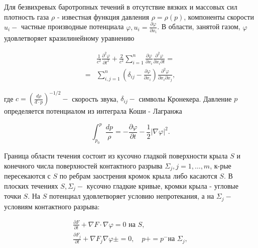 \documentclass[10pt]{article}
\begin{document}
Для безвихревых баротропных течений в отсутствие вязких и массовых сил плотность газа $\rho$ - известная функция давления $\rho=\rho(p)$, компоненты скорости $u_{i}-$ частные производные потенциала $\varphi, u_{i}=\frac{\partial \varphi}{\partial x_{i}}$. В области, занятой газом, $\varphi$ удовлетворяет кразилинейному уравнению



\[

\begin{aligned}

& \frac{1}{c^{2}} \frac{\partial^{2} \varphi}{\partial t^{2}}+\frac{2}{c^{2}} \sum_{i=1}^{n} \frac{\partial \varphi}{\partial x_{i}} \frac{\partial^{2} \varphi}{\partial x_{i} \partial t}= \\

= & \sum_{i, j=1}^{n}\left(\delta_{i j}-\frac{\partial \varphi}{\partial x_{i}}\right) \frac{\partial^{2} \varphi}{\partial x_{i} \partial x_{j}},

\end{aligned}

\]



где $c=\left(\frac{d \rho}{d \cdot p}\right)^{-1 / 2}-$ скорость звука, $\delta_{i j}-$ символы Кронекера. Давление $p$ определяется потенциалом из интеграла Коши - Лагранжа



\[

\int_{p_{0}}^{p} \frac{d p}{\rho}=-\frac{\partial \varphi}{\partial t}-\frac{1}{2}|\nabla \varphi|^{2} .

\]



Граница области течения состоит из кусочно гладкой поверхности крыла $S$ и конечного числа поверхностей контактного разрыва $\Sigma_{j}, j=1, \ldots, m$, к-рые пересекаются с $S$ по ребрам заострения кромок крыла либо касаются $S$. В плоских течениях $S, \Sigma_{j}-$ кусочно гладкие кривые, кромки крыла - угловые точки $S$. На $S$ потенциал удовлетворяет условию непротекания, а на $\Sigma_{j}-$ условиям контактного разрыва:



\[

\begin{gathered}

\frac{\partial F}{\partial t}+\nabla F \cdot \nabla \varphi=0 \text { на } S, \\

\frac{\partial F_{j}}{\partial t}+\nabla F_{j} \nabla \varphi \pm=0, \quad p+=p^{-} \text {на } \Sigma_{j},

\end{gathered}

\]
\end{document}
